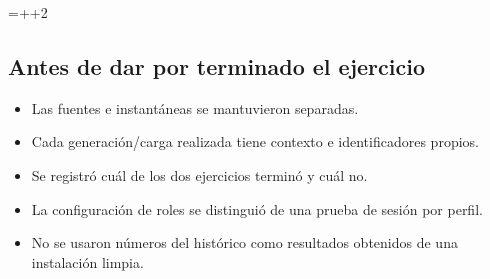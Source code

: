 \begin{enumerate}
{\par
}
=\dimexpr{}++2\baselineskip\relax
\ifdim\dimen0<\textheight
\Needspace{\dimen0}
\endgroup
\item \begin{samepage}
\textbf{Minutos 58-60.} Complete la hoja y responda qué hizo la IA, qué controló el servidor y qué aprobó una persona. Elija la próxima práctica.

{\small\textbf{Tiempo máximo previsto de este bloque:} 2 minutos.\par}
\textbf{Qué debe observar:} Queda una bitácora reproducible con avances, límites e incidencias, incluso si no concluyeron las dos cargas.

\textbf{Qué registrar:} Estado de cada fuente y tareas pendientes específicas.

\textbf{Si no se cumple:} No calificar todo el recorrido como exitoso si falta evidencia de alguna etapa.

\end{samepage}
\else
\endgroup
\item \textbf{Minutos 58-60.} Complete la hoja y responda qué hizo la IA, qué controló el servidor y qué aprobó una persona. Elija la próxima práctica.

{\small\textbf{Tiempo máximo previsto de este bloque:} 2 minutos.\par}
\textbf{Qué debe observar:} Queda una bitácora reproducible con avances, límites e incidencias, incluso si no concluyeron las dos cargas.

\textbf{Qué registrar:} Estado de cada fuente y tareas pendientes específicas.

\textbf{Si no se cumple:} No calificar todo el recorrido como exitoso si falta evidencia de alguna etapa.

\fi
\end{enumerate}
\subsection{Antes de dar por terminado el ejercicio}
\begin{itemize}
\item Las fuentes e instantáneas se mantuvieron separadas.
\item Cada generación/carga realizada tiene contexto e identificadores propios.
\item Se registró cuál de los dos ejercicios terminó y cuál no.
\item La configuración de roles se distinguió de una prueba de sesión por perfil.
\item No se usaron números del histórico como resultados obtenidos de una instalación limpia.
\end{itemize}

